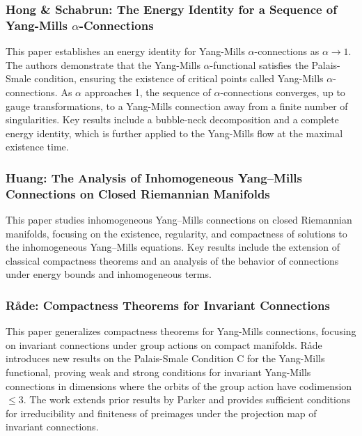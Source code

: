 \documentclass[10pt, letterpaper]{article}
\theoremstyle{custom}
\theoremstyle{definition}
\begin{document}
\subsubsection{Hong \& Schabrun: The Energy Identity for a Sequence of Yang-Mills \(\alpha\)-Connections \cite{hong2014energy}} 
This paper establishes an energy identity for Yang-Mills \(\alpha\)-connections as \(\alpha \to 1\). The authors demonstrate that the Yang-Mills \(\alpha\)-functional satisfies the Palais-Smale condition, ensuring the existence of critical points called Yang-Mills \(\alpha\)-connections. As \(\alpha\) approaches 1, the sequence of \(\alpha\)-connections converges, up to gauge transformations, to a Yang-Mills connection away from a finite number of singularities. Key results include a bubble-neck decomposition and a complete energy identity, which is further applied to the Yang-Mills flow at the maximal existence time.


\subsubsection{Huang: The Analysis of Inhomogeneous Yang–Mills Connections on Closed Riemannian Manifolds \cite{huang2020inhomogeneous}} 
This paper studies inhomogeneous Yang–Mills connections on closed Riemannian manifolds, focusing on the existence, regularity, and compactness of solutions to the inhomogeneous Yang–Mills equations. Key results include the extension of classical compactness theorems and an analysis of the behavior of connections under energy bounds and inhomogeneous terms.


\subsubsection{Råde: Compactness Theorems for Invariant Connections \cite{rade2000compactness}} 
This paper generalizes compactness theorems for Yang-Mills connections, focusing on invariant connections under group actions on compact manifolds. Råde introduces new results on the Palais-Smale Condition C for the Yang-Mills functional, proving weak and strong conditions for invariant Yang-Mills connections in dimensions where the orbits of the group action have codimension \(\leq 3\). The work extends prior results by Parker and provides sufficient conditions for irreducibility and finiteness of preimages under the projection map of invariant connections.



\vspace{1cm}
\end{document}
